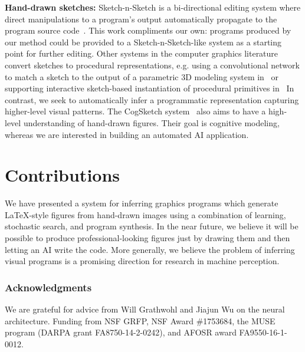 \documentclass{article}
\theoremstyle{definition}
\begin{document}


\textbf{Hand-drawn sketches:} Sketch-n-Sketch is a bi-directional editing system where direct manipulations to a program's output automatically propagate to the program source code~\citep{Hempel:2016:SSP:2984511.2984575}. This work  compliments our own: programs produced by our method could be provided to a Sketch-n-Sketch-like system as a starting point for further editing.
Other systems in the computer graphics literature convert sketches to procedural representations, e.g. using a convolutional network to match a sketch to the output of a parametric 3D modeling system in~\citep{huang2017shape} or supporting interactive sketch-based instantiation of procedural primitives in~\citep{Nishida:2016:ISU:2897824.2925951}
In contrast, we seek to automatically infer a programmatic representation capturing higher-level visual patterns.
The CogSketch system~\citep{forbus2011cogsketch} also aims to have a high-level understanding of hand-drawn figures. Their  goal is cognitive modeling, whereas we are interested in building an automated AI application.%
\section{Contributions}

We have presented a system for inferring graphics programs which generate \LaTeX-style figures from hand-drawn images using a combination of learning, stochastic search, and program synthesis.
In the near future, we believe it will be possible to produce professional-looking figures just by drawing them and then letting an AI write the code.
More generally, we believe the problem of inferring visual programs is a promising direction for research in machine perception.
\subsubsection*{Acknowledgments} We are grateful for advice from Will Grathwohl and Jiajun Wu on  the neural architecture. Funding from NSF GRFP, NSF Award 
\#1753684, the MUSE program (DARPA grant FA8750-14-2-0242),
and AFOSR award FA9550-16-1-0012.


{\small }
\end{document}

